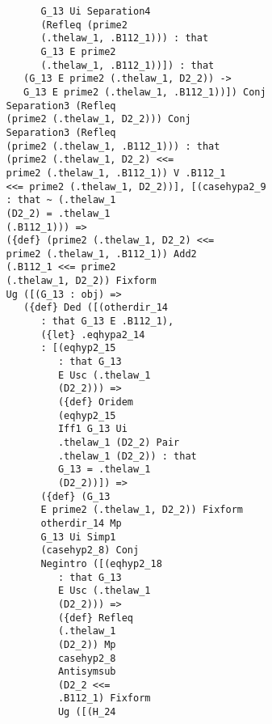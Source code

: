 \documentclass[12pt]{article}
\begin{document}
\begin{verbatim}
                            G_13 Ui Separation4 
                            (Refleq (prime2 
                            (.thelaw_1, .B112_1))) : that 
                            G_13 E prime2 
                            (.thelaw_1, .B112_1))]) : that 
                         (G_13 E prime2 (.thelaw_1, D2_2)) -> 
                         G_13 E prime2 (.thelaw_1, .B112_1))]) Conj 
                      Separation3 (Refleq 
                      (prime2 (.thelaw_1, D2_2))) Conj 
                      Separation3 (Refleq 
                      (prime2 (.thelaw_1, .B112_1))) : that 
                      (prime2 (.thelaw_1, D2_2) <<= 
                      prime2 (.thelaw_1, .B112_1)) V .B112_1 
                      <<= prime2 (.thelaw_1, D2_2))], [(casehypa2_9 
                      : that ~ (.thelaw_1 
                      (D2_2) = .thelaw_1 
                      (.B112_1))) => 
                      ({def} (prime2 (.thelaw_1, D2_2) <<= 
                      prime2 (.thelaw_1, .B112_1)) Add2 
                      (.B112_1 <<= prime2 
                      (.thelaw_1, D2_2)) Fixform 
                      Ug ([(G_13 : obj) => 
                         ({def} Ded ([(otherdir_14 
                            : that G_13 E .B112_1), 
                            ({let} .eqhypa2_14 
                            : [(eqhyp2_15 
                               : that G_13 
                               E Usc (.thelaw_1 
                               (D2_2))) => 
                               ({def} Oridem 
                               (eqhyp2_15 
                               Iff1 G_13 Ui 
                               .thelaw_1 (D2_2) Pair 
                               .thelaw_1 (D2_2)) : that 
                               G_13 = .thelaw_1 
                               (D2_2))]) => 
                            ({def} (G_13 
                            E prime2 (.thelaw_1, D2_2)) Fixform 
                            otherdir_14 Mp 
                            G_13 Ui Simp1 
                            (casehyp2_8) Conj 
                            Negintro ([(eqhyp2_18 
                               : that G_13 
                               E Usc (.thelaw_1 
                               (D2_2))) => 
                               ({def} Refleq 
                               (.thelaw_1 
                               (D2_2)) Mp 
                               casehyp2_8 
                               Antisymsub 
                               (D2_2 <<= 
                               .B112_1) Fixform 
                               Ug ([(H_24 

\end{verbatim}
\end{document}
